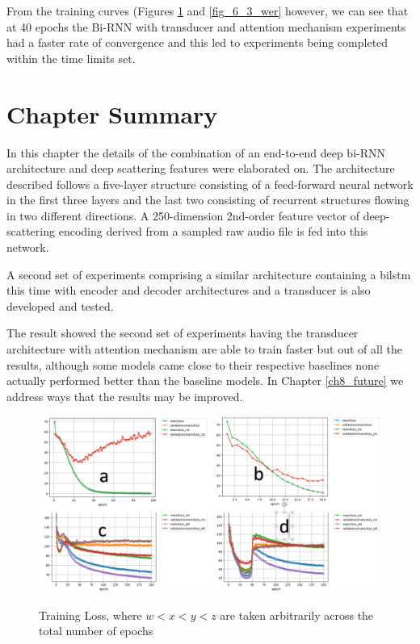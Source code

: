 From the training curves (Figures \ref{fig_6_2_loss} and \ref{fig_6_3_wer} however, we can see that at 40 epochs the Bi-RNN with transducer and attention mechanism experiments had a faster rate of convergence and this led to experiments being completed within the time limits set.

\section{Chapter Summary}

In this chapter the details of the combination of an end-to-end deep bi-RNN architecture and deep scattering features were elaborated on.  The architecture described follows a five-layer structure consisting of a feed-forward neural network in the first three layers and the last two consisting of recurrent structures flowing in two different directions.  A 250-dimension 2nd-order feature vector of deep-scattering encoding derived from a sampled raw audio file is fed into this network.

A second set of experiments comprising a similar architecture containing a \acrshort{bilstm} this time with encoder and decoder architectures and a transducer is also developed and tested.

The result showed the second set of experiments having the transducer architecture with attention mechanism are able to train faster but out of all the results, although some models came close to their respective baselines none actually performed better than the baseline models.  In Chapter \ref{ch8_future} we address ways that the results may be improved.

\stopblue

\begin{figure}
\centering
  \includegraphics[width=14cm]{thesis/images/scatter_res.PNG}\\
  \caption{Training Loss, where $w<x<y<z$ are taken arbitrarily across the
total number of epochs} \label{fig_6_2_loss}
\end{figure}

